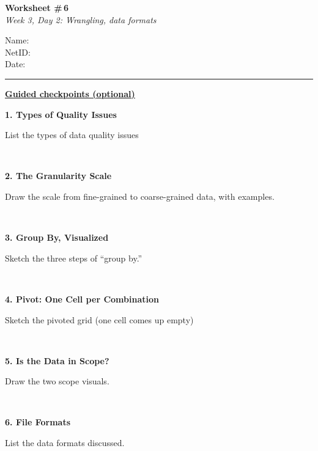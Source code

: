 \documentclass[11pt]{article}
\newcommand{\blankspace}[1]{%
  \vspace{0.3em}
  \begin{minipage}[t][#1][t]{\linewidth}
  \end{minipage}
  \vspace{0.3em}
}
\newcommand{\guidedopen}[4]{%
  \noindent\textbf{#1}\\[0.18em]
  \noindent
  \begin{minipage}[t]{0.485\textwidth}
    #2
    \blankspace{#3}
  \end{minipage}
  \hfill
  \begin{minipage}[t]{0.485\textwidth}
    \blankspace{#4}
  \end{minipage}
  \\[0.4em]
}
\begin{document}
\RaggedRight

\noindent
\begin{minipage}[t]{0.55\textwidth}
  \vspace{0pt}
  {\LARGE \textbf{Worksheet \#\,6}} \\[0.18em]
  {\large \textit{Week 3, Day 2: Wrangling, data formats}}
\end{minipage}
\hfill
\begin{minipage}[t]{0.40\textwidth}
  \vspace{0pt}
  \small
  Name: \underline{\hspace{4.5cm}} \\[0.35em]
  NetID: \underline{\hspace{4.3cm}} \\[0.35em]
  Date: \underline{\hspace{4.4cm}} \\
\end{minipage}

\vspace{0.6em}
\noindent\rule{\linewidth}{0.6pt}
\vspace{0.1em}

\noindent\underline{\textbf{Guided checkpoints (optional)}}
\vspace{0.8em}

\guidedopen{1. Types of Quality Issues}{
List the  types of data quality issues
}{3.2cm}{4.0cm}

\vfill

\guidedopen{2. The Granularity Scale}{
Draw the scale from fine-grained to coarse-grained data, with examples.
}{4.0cm}{4.8cm}

\vfill

\guidedopen{3. Group By, Visualized}{
Sketch the three steps of ``group by.''
}{4.3cm}{5.2cm}

\newpage

\guidedopen{4. Pivot: One Cell per Combination}{
Sketch the pivoted grid (one cell comes up empty)
}{4.0cm}{4.8cm}

\vfill

\guidedopen{5. Is the Data in Scope?}{
Draw the two scope visuals.
}{4.0cm}{5.0cm}

\vfill

\guidedopen{6. File Formats}{
List the data formats discussed.
}{3.2cm}{4.0cm}

\vfill
\end{document}
